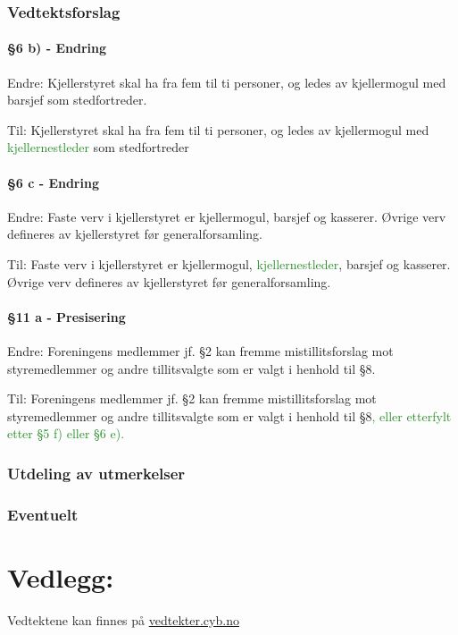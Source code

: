 \documentclass[10pt,norsk,a4paper,usenames,dvipsnames]{article}
\begin{document}
\section{Vedtektsforslag}

    \subsection{§6 b) - Endring}
    Endre:
    Kjellerstyret skal ha fra fem til ti personer, og ledes av kjellermogul med \textcolor{BrickRed}{barsjef} som stedfortreder.

    Til:
    Kjellerstyret skal ha fra fem til ti personer, og ledes av kjellermogul med \textcolor{ForestGreen}{kjellernestleder} som stedfortreder


    \subsection{§6 c - Endring}
    Endre:
    Faste verv i kjellerstyret er kjellermogul, barsjef og kasserer. Øvrige verv defineres av kjellerstyret før generalforsamling.

    Til:
    Faste verv i kjellerstyret er kjellermogul, \textcolor{ForestGreen}{kjellernestleder}, barsjef og kasserer. Øvrige verv defineres av kjellerstyret før generalforsamling.


    \subsection{§11 a - Presisering}
    Endre:
    Foreningens medlemmer jf. §2 kan fremme mistillitsforslag mot styremedlemmer og andre tillitsvalgte som er valgt i henhold til §8.

    Til:
    Foreningens medlemmer jf. §2 kan fremme mistillitsforslag mot styremedlemmer og andre tillitsvalgte som er valgt i henhold til §8\textcolor{ForestGreen}{, eller etterfylt etter §5 f) eller §6 e).}



\section{Utdeling av utmerkelser}


\section{Eventuelt}


\part*{Vedlegg:}\label{lastpage}

    \centering\huge Vedtektene kan finnes på \href{vedtekter.cyb.no}{vedtekter.cyb.no}


% 
\end{document}
